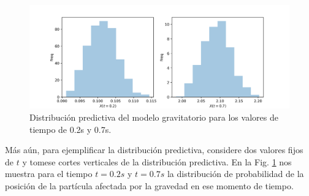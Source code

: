 \begin{figure}[H] 
    \centering 
    \includegraphics[width = 14 cm]{img/Exp_Central_gravedad_sigma/Figuras/Generales/TiempoFijo_gravedad_sigma.png} 
    \caption{Distribución predictiva del modelo gravitatorio para los valores de tiempo de 0.2s y 0.7s.}
    \label{Fig. 3.2.2.07}
\end{figure} 
Más aún, para ejemplificar la distribución predictiva, considere dos valores fijos de $t$ y tomese cortes verticales de la distribución predictiva. En la Fig. \ref{Fig. 3.2.2.07} nos muestra para el tiempo $t = 0.2 s$ y $t = 0.7s$ la distribución de probabilidad de la posición de la partícula afectada por la gravedad en ese momento de tiempo. 










